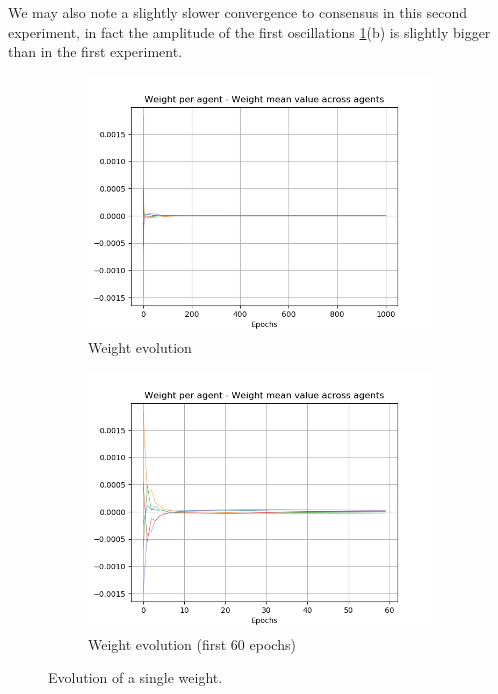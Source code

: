 \documentclass[a4paper,11pt,oneside]{book}
\begin{document}
We may also note a slightly slower convergence to consensus in this second experiment, in fact the amplitude of the first oscillations \ref{test2_var}(b) is slightly bigger than in the first experiment. 

\begin{figure}[h]
\centering
	\begin{subfigure}{0.49\textwidth}	
	\includegraphics[width=\textwidth]{figs/test2/Single_weight.png}
	\caption{Weight evolution}
	\end{subfigure}
\hfill
	\begin{subfigure}{0.49\textwidth}	
	\includegraphics[width=\textwidth]{figs/test2/Single_weight-60.png}
	\caption{Weight evolution (first 60 epochs)}
	\end{subfigure}
\caption{Evolution of a single weight.}
\label{test2_var}
\end{figure}
\end{document}

